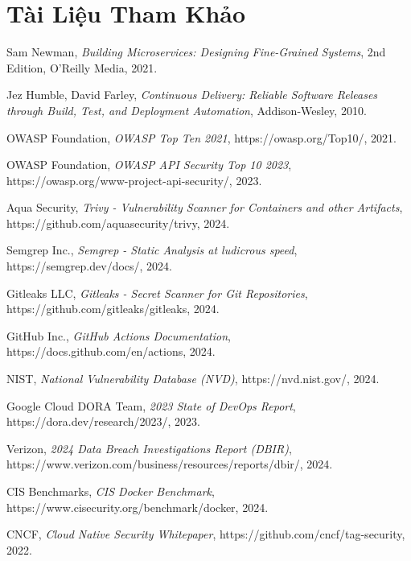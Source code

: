 \documentclass[12pt,a4paper]{report}
\begin{document}
\chapter*{Tài Liệu Tham Khảo}

\begin{enumerate}[label={[\arabic*]}]
    \item Sam Newman, \textit{Building Microservices: Designing Fine-Grained Systems}, 2nd Edition, O'Reilly Media, 2021.
    \item Jez Humble, David Farley, \textit{Continuous Delivery: Reliable Software Releases through Build, Test, and Deployment Automation}, Addison-Wesley, 2010.
    \item OWASP Foundation, \textit{OWASP Top Ten 2021}, https://owasp.org/Top10/, 2021.
    \item OWASP Foundation, \textit{OWASP API Security Top 10 2023}, https://owasp.org/www-project-api-security/, 2023.
    \item Aqua Security, \textit{Trivy - Vulnerability Scanner for Containers and other Artifacts}, https://github.com/aquasecurity/trivy, 2024.
    \item Semgrep Inc., \textit{Semgrep - Static Analysis at ludicrous speed}, https://semgrep.dev/docs/, 2024.
    \item Gitleaks LLC, \textit{Gitleaks - Secret Scanner for Git Repositories}, https://github.com/gitleaks/gitleaks, 2024.
    \item GitHub Inc., \textit{GitHub Actions Documentation}, https://docs.github.com/en/actions, 2024.
    \item NIST, \textit{National Vulnerability Database (NVD)}, https://nvd.nist.gov/, 2024.
    \item Google Cloud DORA Team, \textit{2023 State of DevOps Report}, https://dora.dev/research/2023/, 2023.
    \item Verizon, \textit{2024 Data Breach Investigations Report (DBIR)}, https://www.verizon.com/business/resources/reports/dbir/, 2024.
    \item CIS Benchmarks, \textit{CIS Docker Benchmark}, https://www.cisecurity.org/benchmark/docker, 2024.
    \item CNCF, \textit{Cloud Native Security Whitepaper}, https://github.com/cncf/tag-security, 2022.
\end{enumerate}
\end{document}
